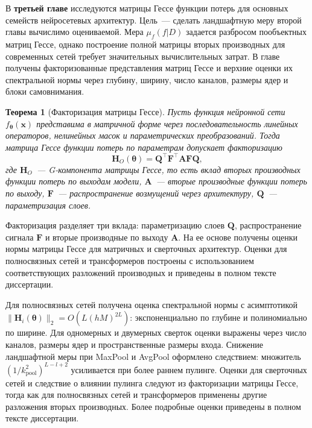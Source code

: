 \documentclass{dissert}
\newtheorem{theorem}{Теорема}
\begin{document}
В \textbf{третьей главе} исследуются матрицы Гессе функции потерь для основных семейств нейросетевых архитектур.
Цель~--- сделать ландшафтную меру второй главы вычислимо оцениваемой.
Мера $\mu_f(f|D)$ задается разбросом пообъектных матриц Гессе, однако построение полной матрицы вторых производных для современных сетей требует значительных вычислительных затрат.
В главе получены факторизованные представления матриц Гессе и верхние оценки их спектральной нормы через глубину, ширину, число каналов, размеры ядер и блоки самовнимания.

\begin{theorem}[Факторизация матрицы Гессе]
    Пусть функция нейронной сети $f_{\boldsymbol{\theta}}(\mathbf{x})$ представима в матричной форме через последовательность линейных операторов, нелинейных масок и параметрических преобразований. Тогда матрица Гессе функции потерь по параметрам допускает факторизацию
\[
    \mathbf{H}_O(\boldsymbol{\theta})
    =
    \mathbf{Q}^{\top}\mathbf{F}^{\top}\mathbf{A}\mathbf{F}\mathbf{Q},
\]
где $\mathbf{H}_O$~--- G-компонента матрицы Гессе, то есть вклад вторых производных функции потерь по выходам модели, $\mathbf{A}$~--- вторые производные функции потерь по выходу, $\mathbf{F}$~--- распространение возмущений через архитектуру, $\mathbf{Q}$~--- параметризация слоев.
\end{theorem}
Факторизация разделяет три вклада: параметризацию слоев $\mathbf{Q}$, распространение сигнала $\mathbf{F}$ и вторые производные по выходу $\mathbf{A}$.
На ее основе получены оценки нормы матрицы Гессе для матричных и сверточных архитектур. Оценки для полносвязных сетей и трансформеров построены с использованием соответствующих разложений производных и приведены в полном тексте диссертации.

Для полносвязных сетей получена оценка спектральной нормы с асимптотикой $\|\mathbf{H}_i(\boldsymbol{\theta})\|_2=O(L(hM)^{2L})$: экспоненциально по глубине и полиномиально по ширине.
Для одномерных и двумерных сверток оценки выражены через число каналов, размеры ядер и пространственные размеры входа.
Снижение ландшафтной меры при MaxPool и AvgPool оформлено следствием: множитель $(1/k_{\mathrm{pool}}^2)^{L-l+2}$ усиливается при более раннем пулинге.
Оценки для сверточных сетей и следствие о влиянии пулинга следуют из факторизации матрицы Гессе, тогда как для полносвязных сетей и трансформеров применены другие разложения вторых производных.
Более подробные оценки приведены в полном тексте диссертации.
\end{document}
